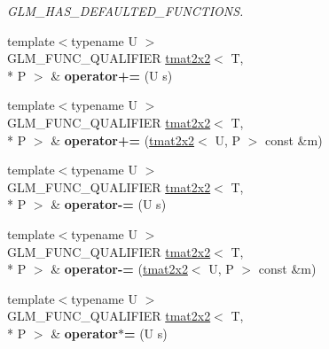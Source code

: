 \begin{DoxyCompactItemize}
\begin{DoxyCompactList}\small\item\em G\-L\-M\-\_\-\-H\-A\-S\-\_\-\-D\-E\-F\-A\-U\-L\-T\-E\-D\-\_\-\-F\-U\-N\-C\-T\-I\-O\-N\-S. \end{DoxyCompactList}\item 
\hypertarget{structglm_1_1tmat2x2_ab05679240e1cef5e27e2c55b6a62ea93}{{\footnotesize template$<$typename U $>$ }\\G\-L\-M\-\_\-\-F\-U\-N\-C\-\_\-\-Q\-U\-A\-L\-I\-F\-I\-E\-R \hyperlink{structglm_1_1tmat2x2}{tmat2x2}$<$ T, \\*
P $>$ \& {\bfseries operator+=} (U s)}\label{structglm_1_1tmat2x2_ab05679240e1cef5e27e2c55b6a62ea93}

\item 
\hypertarget{structglm_1_1tmat2x2_a2edb661b12cd29f51e3dee238d904408}{{\footnotesize template$<$typename U $>$ }\\G\-L\-M\-\_\-\-F\-U\-N\-C\-\_\-\-Q\-U\-A\-L\-I\-F\-I\-E\-R \hyperlink{structglm_1_1tmat2x2}{tmat2x2}$<$ T, \\*
P $>$ \& {\bfseries operator+=} (\hyperlink{structglm_1_1tmat2x2}{tmat2x2}$<$ U, P $>$ const \&m)}\label{structglm_1_1tmat2x2_a2edb661b12cd29f51e3dee238d904408}

\item 
\hypertarget{structglm_1_1tmat2x2_ab4a95fb86f148daf7e9428dcb76b3d26}{{\footnotesize template$<$typename U $>$ }\\G\-L\-M\-\_\-\-F\-U\-N\-C\-\_\-\-Q\-U\-A\-L\-I\-F\-I\-E\-R \hyperlink{structglm_1_1tmat2x2}{tmat2x2}$<$ T, \\*
P $>$ \& {\bfseries operator-\/=} (U s)}\label{structglm_1_1tmat2x2_ab4a95fb86f148daf7e9428dcb76b3d26}

\item 
\hypertarget{structglm_1_1tmat2x2_aa547a3bd8160981d285b9fef6cb5eff1}{{\footnotesize template$<$typename U $>$ }\\G\-L\-M\-\_\-\-F\-U\-N\-C\-\_\-\-Q\-U\-A\-L\-I\-F\-I\-E\-R \hyperlink{structglm_1_1tmat2x2}{tmat2x2}$<$ T, \\*
P $>$ \& {\bfseries operator-\/=} (\hyperlink{structglm_1_1tmat2x2}{tmat2x2}$<$ U, P $>$ const \&m)}\label{structglm_1_1tmat2x2_aa547a3bd8160981d285b9fef6cb5eff1}

\item 
\hypertarget{structglm_1_1tmat2x2_a455959f3d9d5c8e0e4fb337216202686}{{\footnotesize template$<$typename U $>$ }\\G\-L\-M\-\_\-\-F\-U\-N\-C\-\_\-\-Q\-U\-A\-L\-I\-F\-I\-E\-R \hyperlink{structglm_1_1tmat2x2}{tmat2x2}$<$ T, \\*
P $>$ \& {\bfseries operator$\ast$=} (U s)}\label{structglm_1_1tmat2x2_a455959f3d9d5c8e0e4fb337216202686}


\end{DoxyCompactItemize}

